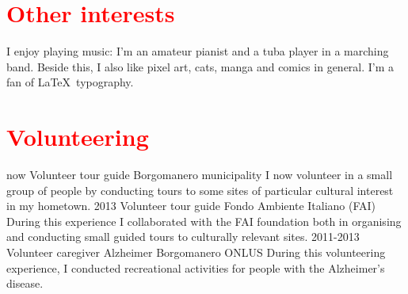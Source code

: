 \documentclass[a4paper]{friggeri-cv}
\begin{document}
\section{\textcolor{red}{Other interests}}
I enjoy playing music: I'm an amateur pianist and a tuba player in a marching band. Beside this, I also like pixel art, cats, manga and comics in general. I'm a fan of \LaTeX\ typography.
\section{\textcolor{red}{Volunteering}}
\begin{entrylist}
	\entry
	{now}
	{Volunteer tour guide}
	{Borgomanero municipality}
	{I now volunteer in a small group of people by conducting tours to some sites of particular cultural interest in my hometown.}
	\entry
	{2013}
	{Volunteer tour guide}
	{Fondo Ambiente Italiano (FAI)}
	{During this experience I collaborated with the FAI foundation both in organising and conducting small guided tours to culturally relevant sites.}
	\entry
	{2011-2013}
	{Volunteer caregiver}
	{Alzheimer Borgomanero ONLUS}
	{During this volunteering experience, I conducted recreational activities for people with the Alzheimer's disease.}
\end{entrylist}
\end{document}
